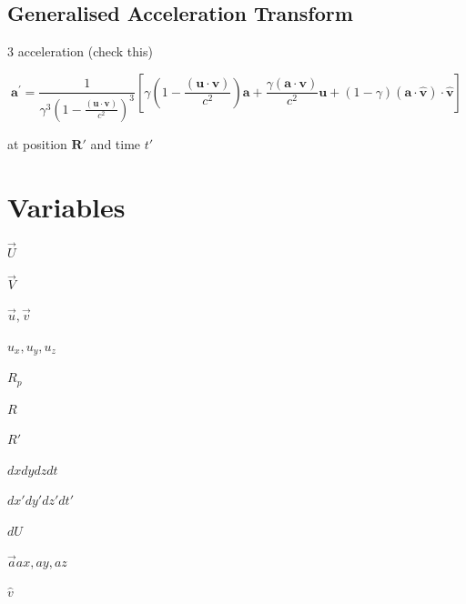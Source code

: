 \subsection{Generalised Acceleration Transform}

3 acceleration (check this)

\begin{equation}
	\mathbf{a^{'}} = \frac{1}{\gamma ^3 \left(1-\frac{(\mathbf{u}\cdot \mathbf{v})}{c^2}\right)^3}\left[ \gamma  \left(1-\frac{(\mathbf{u}\cdot\mathbf{v})}{c^2}\right)\mathbf{a}+\frac{\gamma (\mathbf{a}\cdot\mathbf{v})}{c^2}\mathbf{u} + (1-\gamma ) (\mathbf{a}\cdot\hat{\mathbf{v}}) \cdot\hat{\mathbf{v}}\right]
\end{equation}

at position $\mathbf{R}'$ and time $t'$

\section*{Variables}



$\vec{U}$ \newline

$\vec{V}$ \newline

$\vec{u}, \vec{v}$ \newline

$u_x, u_y, u_z$ \newline

$R_p$ \newline

$R$  \newline

$R'$ \newline

$dx dy dz dt$ \newline

$dx' dy{'} dz' dt'$ \newline

$dU$ \newline

$\vec{a} ax, ay, az$ \newline

$\hat{v}$ \newline


